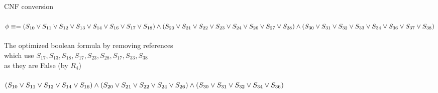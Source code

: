 \documentclass[a4paper, 14pt]{amsart}
\begin{document}
CNF conversion
\\
\\
$
\phi \equiv =
\\
(S_{10} \vee S_{11} \vee S_{12} \vee S_{13} \vee S_{14} \vee S_{16} \vee S_{17} \vee S_{18}) \wedge
\\
(S_{20} \vee S_{21} \vee S_{22} \vee S_{23} \vee S_{24} \vee S_{26} \vee S_{27} \vee S_{28}) \wedge
\\
(S_{30} \vee S_{31} \vee S_{32} \vee S_{33} \vee S_{34} \vee S_{36} \vee S_{37} \vee S_{38})
$
\\
\\
The optimized boolean formula by removing references
\\
which use $S_{17}, S_{13}, S_{18}, S_{17}, S_{23}, S_{28}, S_{17}, S_{33}, S_{38}$ 
\\
as they are False (by $R_4$)
\\
\\
$
(S_{10} \vee S_{11} \vee S_{12} \vee S_{14} \vee S_{16}) \wedge
\\
(S_{20} \vee S_{21} \vee S_{22} \vee S_{24} \vee S_{26}) \wedge
\\
(S_{30} \vee S_{31} \vee S_{32} \vee S_{34} \vee S_{36})
$
\end{document}
